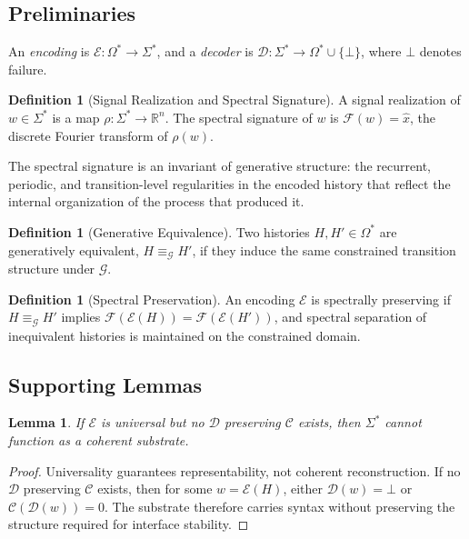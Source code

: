 \documentclass[12pt, a4paper]{article}
\theoremstyle{plain}
\newtheorem{lemma}[theorem]{Lemma}
\theoremstyle{definition}
\newtheorem{definition}[theorem]{Definition}
\theoremstyle{remark}
\begin{document}
\subsection{Preliminaries}

An \emph{encoding} is $\mathcal{E} : \Omega^* \to \Sigma^*$, and a \emph{decoder} is $\mathcal{D} : \Sigma^* \to \Omega^* \cup \{\bot\}$, where $\bot$ denotes failure.

\begin{definition}[Signal Realization and Spectral Signature]
A signal realization of $w \in \Sigma^*$ is a map $\rho : \Sigma^* \to \mathbb{R}^n$. The spectral signature of $w$ is $\mathcal{F}(w) = \hat{x}$, the discrete Fourier transform of $\rho(w)$.
\end{definition}

The spectral signature is an invariant of generative structure: the recurrent, periodic, and transition-level regularities in the encoded history that reflect the internal organization of the process that produced it.

\begin{definition}[Generative Equivalence]
Two histories $H, H' \in \Omega^*$ are generatively equivalent, $H \equiv_{\mathcal{G}} H'$, if they induce the same constrained transition structure under $\mathcal{G}$.
\end{definition}

\begin{definition}[Spectral Preservation]
An encoding $\mathcal{E}$ is spectrally preserving if $H \equiv_{\mathcal{G}} H'$ implies $\mathcal{F}(\mathcal{E}(H)) = \mathcal{F}(\mathcal{E}(H'))$, and spectral separation of inequivalent histories is maintained on the constrained domain.
\end{definition}

\subsection{Supporting Lemmas}

\begin{lemma}
\label{lem:universality}
If $\mathcal{E}$ is universal but no $\mathcal{D}$ preserving $\mathcal{C}$ exists, then $\Sigma^*$ cannot function as a coherent substrate.
\end{lemma}

\begin{proof}
Universality guarantees representability, not coherent reconstruction. If no $\mathcal{D}$ preserving $\mathcal{C}$ exists, then for some $w = \mathcal{E}(H)$, either $\mathcal{D}(w) = \bot$ or $\mathcal{C}(\mathcal{D}(w)) = 0$. The substrate therefore carries syntax without preserving the structure required for interface stability.
\end{proof}
\end{document}
